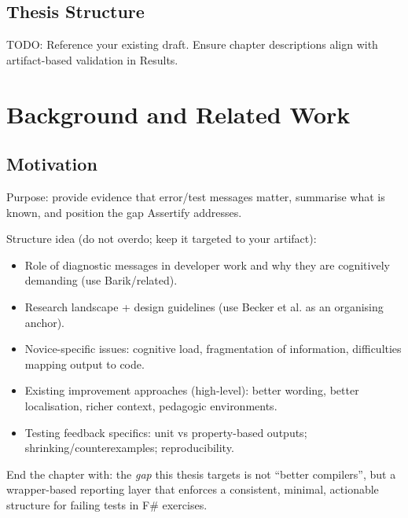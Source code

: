 \documentclass[
	bibliography=totoc,
	listof=totoc,
]{scrbook}
\begin{document}
\section{Thesis Structure} %

\begin{marker}\begin{justify}
TODO: Reference your existing draft. Ensure chapter descriptions align with artifact-based validation in Results.
\end{justify}\end{marker}


\pagebreak %
\chapter{Background and Related Work} %
\section*{Motivation} %

\begin{justify}
Purpose: provide evidence that error/test messages matter, summarise what is known, and position the gap Assertify addresses.

Structure idea (do not overdo; keep it targeted to your artifact):
\begin{itemize}
    \item Role of diagnostic messages in developer work and why they are cognitively demanding (use Barik/related).
    \item Research landscape + design guidelines (use Becker et al. as an organising anchor).
    \item Novice-specific issues: cognitive load, fragmentation of information, difficulties mapping output to code.
    \item Existing improvement approaches (high-level): better wording, better localisation, richer context, pedagogic environments.
    \item Testing feedback specifics: unit vs property-based outputs; shrinking/counterexamples; reproducibility.
\end{itemize}

End the chapter with: the \emph{gap} this thesis targets is not ``better compilers'', but a wrapper-based reporting layer that enforces a consistent, minimal, actionable structure for failing tests in F\# exercises.
\end{justify}
\end{document}
